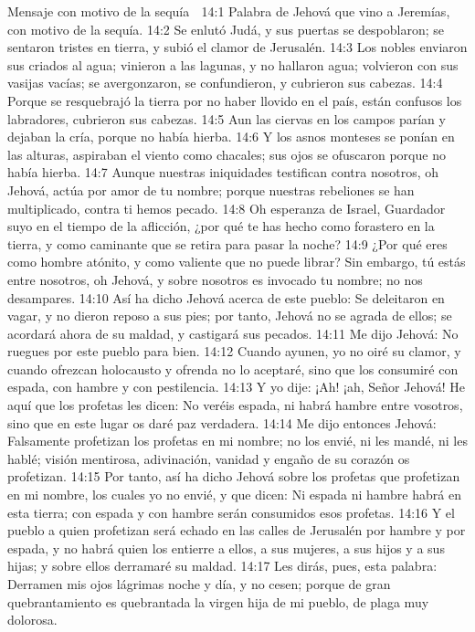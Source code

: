Mensaje con motivo de la sequía  

14:1 Palabra de Jehová que vino a Jeremías, con motivo de la sequía.  
14:2 Se enlutó Judá, y sus puertas se despoblaron; se sentaron tristes en tierra, y subió el clamor de Jerusalén.  
14:3 Los nobles enviaron sus criados al agua; vinieron a las lagunas, y no hallaron agua; volvieron con sus vasijas vacías; se avergonzaron, se confundieron, y cubrieron sus cabezas.  
14:4 Porque se resquebrajó la tierra por no haber llovido en el país, están confusos los labradores, cubrieron sus cabezas.  
14:5 Aun las ciervas en los campos parían y dejaban la cría, porque no había hierba.  
14:6 Y los asnos monteses se ponían en las alturas, aspiraban el viento como chacales; sus ojos se ofuscaron porque no había hierba.  
14:7 Aunque nuestras iniquidades testifican contra nosotros, oh Jehová, actúa por amor de tu nombre; porque nuestras rebeliones se han multiplicado, contra ti hemos pecado.  
14:8 Oh esperanza de Israel, Guardador suyo en el tiempo de la aflicción, ¿por qué te has hecho como forastero en la tierra, y como caminante que se retira para pasar la noche?  
14:9 ¿Por qué eres como hombre atónito, y como valiente que no puede librar? Sin embargo, tú estás entre nosotros, oh Jehová, y sobre nosotros es invocado tu nombre; no nos desampares.  
14:10 Así ha dicho Jehová acerca de este pueblo: Se deleitaron en vagar, y no dieron reposo a sus pies; por tanto, Jehová no se agrada de ellos; se acordará ahora de su maldad, y castigará sus pecados.  
14:11 Me dijo Jehová: No ruegues por este pueblo para bien.  
14:12 Cuando ayunen, yo no oiré su clamor, y cuando ofrezcan holocausto y ofrenda no lo aceptaré, sino que los consumiré con espada, con hambre y con pestilencia.  
14:13 Y yo dije: ¡Ah! ¡ah, Señor Jehová! He aquí que los profetas les dicen: No veréis espada, ni habrá hambre entre vosotros, sino que en este lugar os daré paz verdadera.  
14:14 Me dijo entonces Jehová: Falsamente profetizan los profetas en mi nombre; no los envié, ni les mandé, ni les hablé; visión mentirosa, adivinación, vanidad y engaño de su corazón os profetizan.  
14:15 Por tanto, así ha dicho Jehová sobre los profetas que profetizan en mi nombre, los cuales yo no envié, y que dicen: Ni espada ni hambre habrá en esta tierra; con espada y con hambre serán consumidos esos profetas.  
14:16 Y el pueblo a quien profetizan será echado en las calles de Jerusalén por hambre y por espada, y no habrá quien los entierre a ellos, a sus mujeres, a sus hijos y a sus hijas; y sobre ellos derramaré su maldad.  
14:17 Les dirás, pues, esta palabra: Derramen mis ojos lágrimas noche y día, y no cesen; porque de gran quebrantamiento es quebrantada la virgen hija de mi pueblo, de plaga muy dolorosa.  
